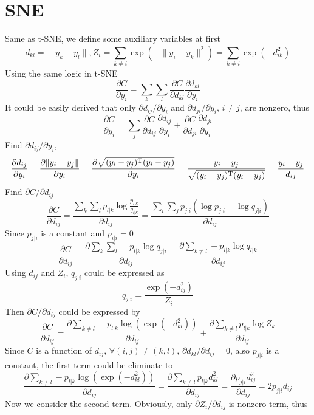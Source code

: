 \documentclass[11pt]{article}
\begin{document}
\section{SNE}
Same as t-SNE, we define some auxiliary variables at first
\cite{maaten2008visualizing}
$$
    d_{kl} = \|y_k - y_l\|, Z_{i} = \sum_{k\neq i} \exp (-\|y_i - y_k\|^2) = 
    \sum_{k\neq i}\exp (-d_{ik}^2)
$$
Using the same logic in t-SNE
$$
\frac{\partial{C}}{\partial{y_i}} = \sum_{k}\sum_{l} \frac{\partial{C}}{\partial{d_{kl}}}
\frac{\partial{d_{kl}}}{\partial{y_i}}
$$
It could be easily derived that only $\partial d_{ij}/\partial y_i$ and $\partial d_{ji}/\partial y_i$, $i\neq j$, 
are nonzero, thus
$$
\frac{\partial{C}}{\partial{y_i}} = \sum_j \frac{\partial{C}}{\partial{d_{ij}}}
\frac{\partial{d_{ij}}}{\partial{y_i}} +\frac{\partial{C}}{\partial{d_{ji}}}
\frac{\partial{d_{ji}}}{\partial{y_i}}
$$
Find $\partial{d_{ij}}/\partial{y_i}$, 
$$
\frac{\partial{d_{ij}}}{\partial{y_i}} = \frac{\partial{\|y_i - y_j\|}}{\partial{y_i}} = 
\frac{\partial\sqrt{(y_i-y_j)^{\rm T}(y_i-y_j)}}{\partial{y_i}} = \frac{y_i-y_j}
{\sqrt{(y_i-y_j)^{\rm T}(y_i-y_j)}} = \frac{y_i-y_j}{d_{ij}}
$$
Find $\partial C/\partial d_{ij}$
$$
\frac{\partial C}{\partial d_{ij}} = \frac{\sum_k \sum_l p_{l|k} \log\frac{p_{l|k}}{q_{l|k}}}
{\partial d_{ij}} = \frac{\sum_i\sum_j p_{j|i}(\log p_{j|i} - \log q_{j|i})}{\partial d_{ij}}
$$
Since $p_{j|i}$ is a constant and $p_{i|i}=0$
$$
\frac{\partial C}{\partial d_{ij}} = \frac{\partial{\sum_k\sum_l -p_{l|k}\log q_{j|i}}}{\partial d_{ij}} = 
\frac{\partial\sum_{k\neq l}-p_{l|k}\log q_{l|k}}{\partial d_{ij}}
$$
Using $d_{ij}$ and $Z_i$, $q_{j|i}$ could be expressed as
$$
    q_{j|i} = \frac{\exp(-d_{ij}^2)}{Z_i}
$$
Then $\partial C/\partial d_{ij}$ could be expressed by
$$
\frac{\partial C}{\partial d_{ij}} = \frac{\partial \sum_{k\neq l}-p_{l|k}\log(\exp (-d_{kl}^2))}{\partial d_{ij}} + 
\frac{\partial \sum_{k\neq l} p_{l|k}\log Z_k}{\partial d_{ij}}
$$
Since $C$ is a function of $d_{ij}$, $\forall (i, j)\neq (k, l)$, $\partial d_{kl}/\partial d_{ij}=0$, 
also $p_{j|i}$ is a constant, the first term could be eliminate to 
$$
\frac{\partial \sum_{k\neq l}-p_{l|k}\log(\exp (-d_{kl}^2))}{\partial d_{ij}} = 
\frac{\partial \sum_{k\neq l}p_{l|k}d_{kl}^2}{\partial d_{ij}}=
\frac{\partial p_{j|i}d_{ij}^2}{\partial d_{ij}} = 2p_{j|i}d_{ij}
$$
Now we consider the second term. Obviously, only $\partial Z_i/\partial d_{ij}$ is nonzero term, thus
\end{document}
